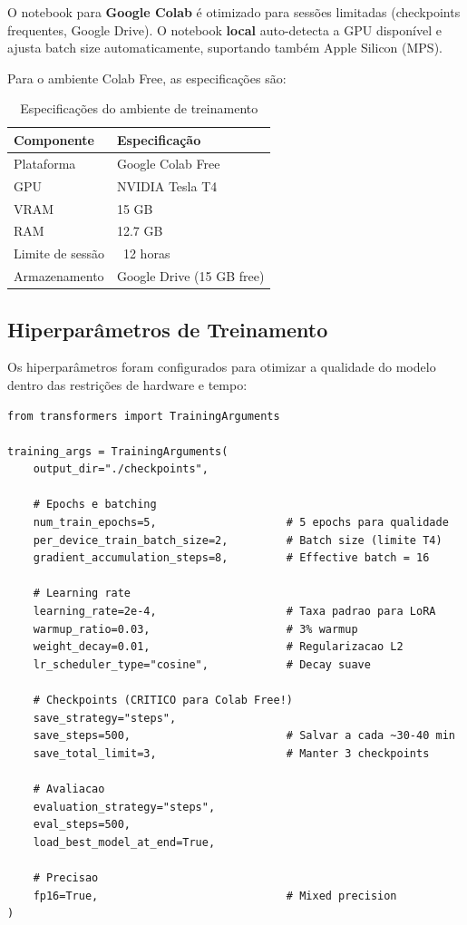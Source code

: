 O notebook para \textbf{Google Colab} é otimizado para sessões limitadas (checkpoints frequentes, Google Drive). O notebook \textbf{local} auto-detecta a GPU disponível e ajusta batch size automaticamente, suportando também Apple Silicon (MPS).

Para o ambiente Colab Free, as especificações são:

\begin{table}[H]
\centering
\caption{Especificações do ambiente de treinamento}
\label{tab:ambiente-treino}
\begin{tabular}{ll}
\toprule
\textbf{Componente} & \textbf{Especificação} \\
\midrule
Plataforma & Google Colab Free \\
GPU & NVIDIA Tesla T4 \\
VRAM & 15 GB \\
RAM & 12.7 GB \\
Limite de sessão & ~12 horas \\
Armazenamento & Google Drive (15 GB free) \\
\bottomrule
\end{tabular}
\end{table}

\subsection{Hiperparâmetros de Treinamento}

Os hiperparâmetros foram configurados para otimizar a qualidade do modelo dentro das restrições de hardware e tempo:

\begin{lstlisting}[caption={Configuração completa do treinamento}, label={lst:training-args}]
from transformers import TrainingArguments

training_args = TrainingArguments(
    output_dir="./checkpoints",

    # Epochs e batching
    num_train_epochs=5,                    # 5 epochs para qualidade
    per_device_train_batch_size=2,         # Batch size (limite T4)
    gradient_accumulation_steps=8,         # Effective batch = 16

    # Learning rate
    learning_rate=2e-4,                    # Taxa padrao para LoRA
    warmup_ratio=0.03,                     # 3% warmup
    weight_decay=0.01,                     # Regularizacao L2
    lr_scheduler_type="cosine",            # Decay suave

    # Checkpoints (CRITICO para Colab Free!)
    save_strategy="steps",
    save_steps=500,                        # Salvar a cada ~30-40 min
    save_total_limit=3,                    # Manter 3 checkpoints

    # Avaliacao
    evaluation_strategy="steps",
    eval_steps=500,
    load_best_model_at_end=True,

    # Precisao
    fp16=True,                             # Mixed precision
)
\end{lstlisting}

